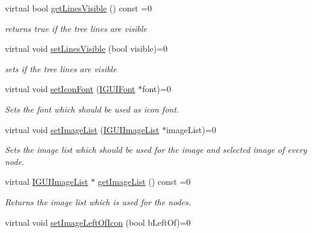\begin{DoxyCompactItemize}
virtual bool \hyperlink{classirr_1_1gui_1_1IGUITreeView_a4f03b904367e362ddc4413c46974d32f}{get\+Lines\+Visible} () const =0
\begin{DoxyCompactList}\small\item\em returns true if the tree lines are visible \end{DoxyCompactList}\item 
virtual void \hyperlink{classirr_1_1gui_1_1IGUITreeView_a7894df49d2f0f3d20e9e998ab1cac373}{set\+Lines\+Visible} (bool visible)=0
\begin{DoxyCompactList}\small\item\em sets if the tree lines are visible \end{DoxyCompactList}\item 
virtual void \hyperlink{classirr_1_1gui_1_1IGUITreeView_a07707331410d7792557c81c90ef4a09b}{set\+Icon\+Font} (\hyperlink{classirr_1_1gui_1_1IGUIFont}{I\+G\+U\+I\+Font} $\ast$font)=0
\begin{DoxyCompactList}\small\item\em Sets the font which should be used as icon font. \end{DoxyCompactList}\item 
virtual void \hyperlink{classirr_1_1gui_1_1IGUITreeView_aaa55170154f44d17e2a8129368c1a010}{set\+Image\+List} (\hyperlink{classirr_1_1gui_1_1IGUIImageList}{I\+G\+U\+I\+Image\+List} $\ast$image\+List)=0
\begin{DoxyCompactList}\small\item\em Sets the image list which should be used for the image and selected image of every node. \end{DoxyCompactList}\item 
\mbox{\label{classirr_1_1gui_1_1IGUITreeView_aeae0fa8b33064209ddc604aec45d461c}} 
virtual \hyperlink{classirr_1_1gui_1_1IGUIImageList}{I\+G\+U\+I\+Image\+List} $\ast$ \hyperlink{classirr_1_1gui_1_1IGUITreeView_aeae0fa8b33064209ddc604aec45d461c}{get\+Image\+List} () const =0
\begin{DoxyCompactList}\small\item\em Returns the image list which is used for the nodes. \end{DoxyCompactList}\item 
\mbox{\label{classirr_1_1gui_1_1IGUITreeView_afb011310d69f466ed6a4955d0c7d3697}} 
virtual void \hyperlink{classirr_1_1gui_1_1IGUITreeView_afb011310d69f466ed6a4955d0c7d3697}{set\+Image\+Left\+Of\+Icon} (bool b\+Left\+Of)=0

\end{DoxyCompactItemize}
